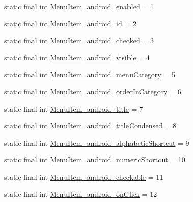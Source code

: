 \begin{DoxyCompactItemize}
\item 
static final int \mbox{\hyperlink{classandroid_1_1support_1_1design_1_1R_1_1styleable_abd762da4c362160343aaeb4245f156d0}{Menu\+Item\+\_\+android\+\_\+enabled}} = 1
\item 
static final int \mbox{\hyperlink{classandroid_1_1support_1_1design_1_1R_1_1styleable_a688e7ac77808e73ad90df268df497de0}{Menu\+Item\+\_\+android\+\_\+id}} = 2
\item 
static final int \mbox{\hyperlink{classandroid_1_1support_1_1design_1_1R_1_1styleable_a79fceb6522155a29f63b64bce1292103}{Menu\+Item\+\_\+android\+\_\+checked}} = 3
\item 
static final int \mbox{\hyperlink{classandroid_1_1support_1_1design_1_1R_1_1styleable_a486cad97abff8c88928c986faf3eee69}{Menu\+Item\+\_\+android\+\_\+visible}} = 4
\item 
static final int \mbox{\hyperlink{classandroid_1_1support_1_1design_1_1R_1_1styleable_afe9e14a41f38cc5f9610d2017e624dbb}{Menu\+Item\+\_\+android\+\_\+menu\+Category}} = 5
\item 
static final int \mbox{\hyperlink{classandroid_1_1support_1_1design_1_1R_1_1styleable_adb952108c9ed0399e3bcf2e3cce497d4}{Menu\+Item\+\_\+android\+\_\+order\+In\+Category}} = 6
\item 
static final int \mbox{\hyperlink{classandroid_1_1support_1_1design_1_1R_1_1styleable_a8266068ad0815309f30d5f35e16bfb2f}{Menu\+Item\+\_\+android\+\_\+title}} = 7
\item 
static final int \mbox{\hyperlink{classandroid_1_1support_1_1design_1_1R_1_1styleable_aa3a614a548134feabb3f1a9e31eac7f0}{Menu\+Item\+\_\+android\+\_\+title\+Condensed}} = 8
\item 
static final int \mbox{\hyperlink{classandroid_1_1support_1_1design_1_1R_1_1styleable_afee7a912a1adb53b44b84875b958dcc2}{Menu\+Item\+\_\+android\+\_\+alphabetic\+Shortcut}} = 9
\item 
static final int \mbox{\hyperlink{classandroid_1_1support_1_1design_1_1R_1_1styleable_a764c1fd0541438a30a1874c9e39faa45}{Menu\+Item\+\_\+android\+\_\+numeric\+Shortcut}} = 10
\item 
static final int \mbox{\hyperlink{classandroid_1_1support_1_1design_1_1R_1_1styleable_a367fcf50180f555cdccedfe8c3c29950}{Menu\+Item\+\_\+android\+\_\+checkable}} = 11
\item 
static final int \mbox{\hyperlink{classandroid_1_1support_1_1design_1_1R_1_1styleable_af998105acfa886bf8fb67beedd37843e}{Menu\+Item\+\_\+android\+\_\+on\+Click}} = 12
\item 

\end{DoxyCompactItemize}
